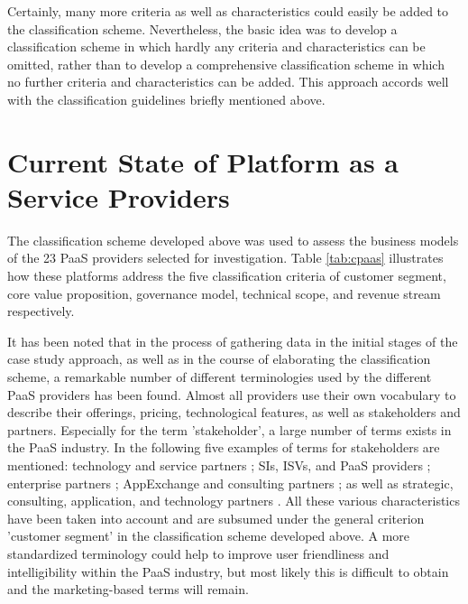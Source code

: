 Certainly, many more criteria as well as characteristics could easily be added to the classification scheme. Nevertheless, the basic idea was to develop a classification scheme in which hardly any criteria and characteristics can be omitted, rather than to develop a comprehensive classification scheme in which no further criteria and characteristics can be added. This approach accords well with the classification guidelines briefly mentioned above.

\section{Current State of Platform as a Service Providers}\label{ch:sota:cPaaS}

The classification scheme developed above was used to assess the business models of the 23 \ac{PaaS} providers selected for investigation. Table \ref{tab:cpaas} illustrates how these platforms address the five classification criteria of customer segment, core value proposition, governance model, technical scope, and revenue stream respectively. 

It has been noted that in the process of gathering data in the initial stages of the case study approach, as well as in the course of elaborating the classification scheme, a remarkable number of different terminologies used by the different \ac{PaaS} providers has been found. Almost all providers use their own vocabulary to describe their offerings, pricing, technological features, as well as stakeholders and partners. Especially for the term 'stakeholder', a large number of terms exists in the \ac{PaaS} industry. In the following five examples of terms for stakeholders are mentioned: technology and service partners \citep{CloudBees2013}; \acp{SI}, \acp{ISV}, and \ac{PaaS} providers \citep{Dell2013}; enterprise partners \citep{OrangeScape2013}; AppExchange and consulting partners \citep{Salesforce.com2013}; as well as strategic, consulting, application, and technology partners \citep{Workday2013}. All these various characteristics have been taken into account and are subsumed under the general criterion 'customer segment' in the classification scheme developed above. A more standardized terminology could help to improve user friendliness and intelligibility within the \ac{PaaS} industry, but most likely this is difficult to obtain and the marketing-based terms will remain.

